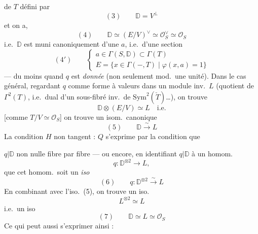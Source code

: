 \documentclass[11pt,a4paper]{article}
\begin{document}
de $T$ défini par
\[
  (3) \qquad \mathbb{D} = V^{\perp}
\]
et on a,  \ill{}
\[
  (4) \qquad \mathbb{D} \simeq (E/V)^{\vee} \simeq \mathcal{O}_{S}^{\vee} \simeq \mathcal{O}_{S}
\]
i.e.\ $\mathbb{D}$ est muni canoniquement d'une   $a$, i.e.\ d'une section
\[
  (4') \qquad
  \begin{cases}
    a \in \Gamma(S, \mathbb{D}) \subset \Gamma(T) \\
    E = \{x \in \Gamma(-, T) \mid \varphi(x, a) = 1\}
  \end{cases}
\]
--- du moins quand $q$ est \emph{donnée} \struck{\ill{}} (non seulement mod.\ une unité). Dans le cas général, regardant $q$ comme forme à valeurs dans un module inv.\ $L$ (quotient de $\Gamma^{2}(T)$, i.e.\ dual d'un sous-fibré inv.\ de $\mathrm{Sym}^{2}(\check{T})$…), on trouve
\[
  \mathbb{D} \otimes (E/V) \simeq L \quad \text{i.e.}
\]
[comme $T/V \simeq \mathcal{O}_{S}$] on trouve un isom.\ canonique
\[
  (5) \qquad \mathbb{D} \xrightarrow{\ \sim\ } L
\]
La condition $H$ non tangent : $Q$ s'exprime  par la condition que

$q \vert \mathbb{D}$ non nulle fibre par fibre --- ou encore, en identifiant $q \vert \mathbb{D}$ à un homom.
\[
  q : \mathbb{D}^{\otimes 2} \longrightarrow L,
\]
que cet homom.\ soit un \emph{iso}
\[
  (6) \qquad q : \mathbb{D}^{\otimes 2} \xrightarrow{\ \sim\ } L
\]
 En combinant avec l'iso.\ (5), on trouve un iso.
\[
  L^{\otimes 2} \simeq L
\]
i.e.\ un iso
\[
  (7) \qquad \mathbb{D} \simeq L \simeq \mathcal{O}_{S}
\]
Ce qui peut aussi s'exprimer ainsi : 
\end{document}
